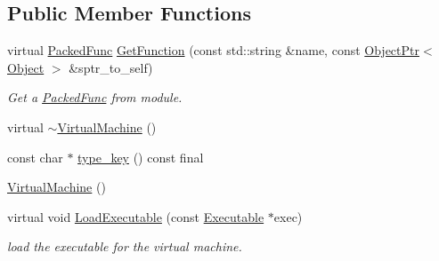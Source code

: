 \subsection*{Public Member Functions}
\begin{DoxyCompactItemize}
\item 
virtual \hyperlink{classtvm_1_1runtime_1_1PackedFunc}{Packed\+Func} \hyperlink{classtvm_1_1runtime_1_1vm_1_1VirtualMachine_a8d1e7cdc6412eae8dea9c2c08c7f48ec}{Get\+Function} (const std\+::string \&name, const \hyperlink{classtvm_1_1runtime_1_1ObjectPtr}{Object\+Ptr}$<$ \hyperlink{classtvm_1_1runtime_1_1Object}{Object} $>$ \&sptr\+\_\+to\+\_\+self)
\begin{DoxyCompactList}\small\item\em Get a \hyperlink{classtvm_1_1runtime_1_1PackedFunc}{Packed\+Func} from module. \end{DoxyCompactList}\item 
virtual \hyperlink{classtvm_1_1runtime_1_1vm_1_1VirtualMachine_a62dead74c40c1a6ac03aec56918d98c7}{$\sim$\+Virtual\+Machine} ()
\item 
const char $\ast$ \hyperlink{classtvm_1_1runtime_1_1vm_1_1VirtualMachine_a00f035566a720dbac56f5dea042fb0ec}{type\+\_\+key} () const final
\item 
\hyperlink{classtvm_1_1runtime_1_1vm_1_1VirtualMachine_a6edbbbb71000617f644232de37d53338}{Virtual\+Machine} ()
\item 
virtual void \hyperlink{classtvm_1_1runtime_1_1vm_1_1VirtualMachine_aae578b4bd354bdd1ab12e91a65ec6fbf}{Load\+Executable} (const \hyperlink{classtvm_1_1runtime_1_1vm_1_1Executable}{Executable} $\ast$exec)
\begin{DoxyCompactList}\small\item\em load the executable for the virtual machine. \end{DoxyCompactList}\end{DoxyCompactItemize}
